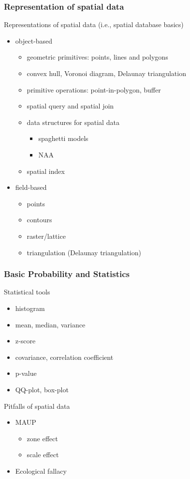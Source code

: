 \documentclass[10pt]{beamer}
\newcommand{\bitemize}{\begin{itemize}}
\newcommand{\eitemize}{\end{itemize}}
\newcommand{\bblock}{\begin{block}}
\newcommand{\eblock}{\end{block}}
\begin{document}

\begin{frame}

\frametitle{Representation of spatial data}
\bblock{Representations of spatial data (i.e., spatial database basics)}
\bitemize
\item object-based 
\bitemize
\item geometric primitives: points, lines and polygons
\item convex hull, Voronoi diagram, Delaunay triangulation
\item primitive operations: point-in-polygon, buffer
\item spatial query and spatial join
\item data structures for spatial data
\bitemize 
\item spaghetti models
\item NAA
\eitemize
\item spatial index
\eitemize
\item field-based 
\bitemize
\item points
\item contours
\item raster/lattice
\item triangulation (Delaunay triangulation)
\eitemize
\eitemize
\eblock

\end{frame}


\begin{frame}

\frametitle{Basic Probability and Statistics}
\bblock{Statistical tools}
\bitemize
\item histogram
\item mean, median, variance  
\item z-score
\item covariance, correlation coefficient
\item p-value
\item QQ-plot, box-plot 
\eitemize
\eblock

\bblock{Pitfalls of spatial data}
\bitemize
\item MAUP
\bitemize
\item zone effect
\item scale effect
\eitemize
\item Ecological fallacy
\eitemize
\eblock

\end{frame}
\end{document}
